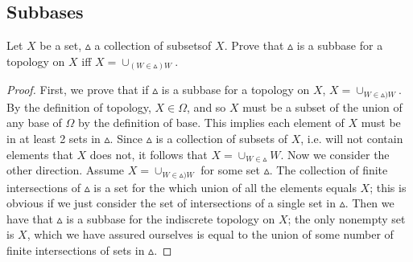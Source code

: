 \subsection{Subbases}
\begin{minorEx}%
Let $X$ be a set, $\vartriangle$ a collection of subsetsof $X$. Prove that $\vartriangle$ is a subbase for a topology on $X$ iff $X = \cup_{(W \in \vartriangle) W}$.
\end{minorEx}
\begin{proof}
First, we prove that if $\vartriangle$ is a subbase for a topology on $X$, $X = \cup_{W \in \vartriangle) W}$. By the definition of topology, $X \in \Omega$, and so $X$ must be a subset of the union of any base of $\Omega$ by the definition of base. This implies each element of $X$ must be in at least 2 sets in $\vartriangle$. Since $\vartriangle$ is a collection of subsets of $X$, i.e. will not contain elements that $X$ does not, it follows that $X = \cup_{W \in \vartriangle} W$.
Now we consider the other direction. Assume $X = \cup_{W \in \vartriangle) W}$ for some set $\vartriangle$. The collection of finite intersections of $\vartriangle$ is a set for the which union of all the elements equals $X$; this is obvious if we just consider the set of intersections of a single set in $\vartriangle$. Then we have that $\vartriangle$ is a subbase for the indiscrete topology on $X$; the only nonempty set is $X$, which we have assured ourselves is equal to the union of some number of finite intersections of sets in $\vartriangle$.
\end{proof}
